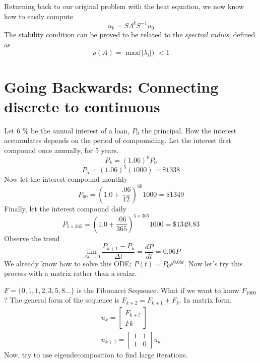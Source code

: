 \documentclass[11pt]{article}
\begin{document}
Returning back to our original problem with the heat equation, we now know how to easily compute 
$$ u_k = S\Lambda^k S^{-1} u_0 $$
The stability condition can be proved to be related to the \emph{spectral radius}, defined as
\begin{equation}
\rho(A) = \text{  max($|\lambda_i |$)  } < 1 
\end{equation}

\section{Going Backwards: Connecting discrete to continuous}
Let 6 \% be the annual interest of a loan, $P_0$ the principal. How the interest accumulates depends on the period of compounding. Let the interest first compound once annually, for 5 years.
$$ P_k = (1.06)^k P_0 $$ 
$$ P_5 = (1.06)^5 (1000)  = \$1338 $$
Now let the interest compound monthly
$$ P_{60} = (1.0 + \frac{.06}{12})^{60} 1000 = \$ 1349 $$
Finally, let the interest compound daily
$$ P_{5\times 365} = (1.0 + \frac{.06}{365})^{5\times 365} 1000 = \$ 1349.83 $$
Observe the trend
\begin{equation}
\lim_{\Delta t \rightarrow 0} \frac{P_{k+1} - P_k}{\Delta t} = \frac{dP}{dt} = 0.06P
\end{equation}
We already know how to solve this ODE; $P(t) = P_0e^{0.06t}$. Now let's try this process with a matrix rather than a scalar.


$F = \lbrace 0,1,1,2,3,5,8 \ldots \rbrace$ is the Fibonacci Sequence. What if we want to know $F_{1000}$? The general form of the sequence is $F_{k+2} = F_{k+1} + F_{k}$.  In matrix form,
\begin{eqnarray}
u_k = \begin{bmatrix}
F_{k+l} \\ F{k}
\end{bmatrix}
\\
u_{k+1} = \begin{bmatrix}
1 & 1 \\
1 & 0
\end{bmatrix}
u_k
\end{eqnarray}
Now, try to use eigendecomposition to find large iterations. 
\end{document}
